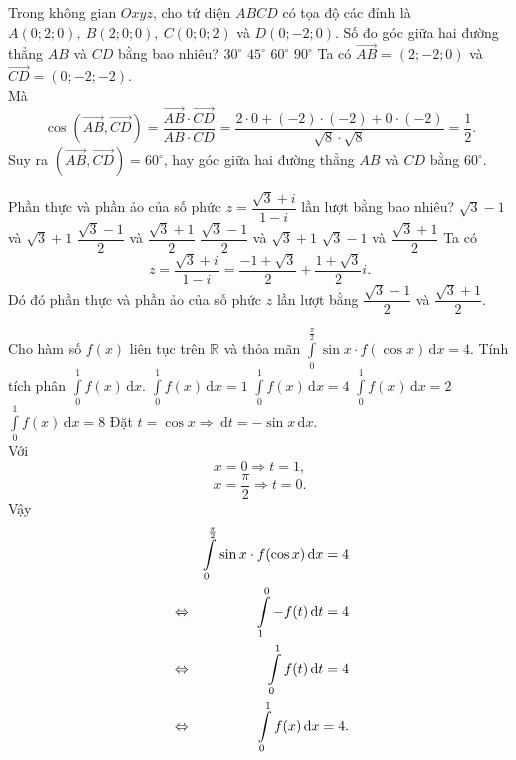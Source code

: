 \begin{ex}%
	Trong không gian $Oxyz$, cho tứ diện $ABCD$ có tọa độ các đỉnh là $A(0;2;0),~B(2;0;0),~C(0;0;2)$ và $D(0;-2;0)$. Số đo góc giữa hai đường thẳng $AB$ và $CD$ bằng bao nhiêu? 
	\choice
	{$30^\circ$}
	{$45^\circ$}
	{\True $60^\circ$}
	{$90^\circ$}
	\loigiai
	{
		Ta có $\vec{AB}=(2;-2;0)$ và $\vec{CD}=(0;-2;-2)$.\\
		Mà 
		\[\cos\left(\vec{AB},\vec{CD}\right)=\dfrac{\vec{AB}\cdot\vec{CD}}{AB\cdot CD}=\dfrac{2\cdot0+(-2)\cdot(-2)+0\cdot(-2)}{\sqrt{8}\cdot\sqrt{8}}=\dfrac{1}{2}.\]
		Suy ra $\left(\vec{AB},\vec{CD}\right)=60^\circ$, hay góc giữa hai đường thẳng $AB$ và $CD$ bằng $60^\circ$.
	}
\end{ex}

\begin{ex}%
	Phần thực và phần ảo của số phức $z=\dfrac{\sqrt{3}+i}{1-i}$ lần lượt bằng bao nhiêu?
	\choice
	{$\sqrt{3}-1$ và $\sqrt{3}+1$}
	{\True $\dfrac{\sqrt{3}-1}{2}$ và $\dfrac{\sqrt{3}+1}{2}$}
	{$\dfrac{\sqrt{3}-1}{2}$ và $\sqrt{3}+1$}
	{$\sqrt{3}-1$ và $\dfrac{\sqrt{3}+1}{2}$}
	\loigiai
	{
		Ta có 
		\[z=\dfrac{\sqrt{3}+i}{1-i}=\dfrac{-1+\sqrt{3}}{2}+\dfrac{1+\sqrt{3}}{2}i.\]
		Dó đó phần thực và phần ảo của số phức $z$ lần lượt bằng $\dfrac{\sqrt{3}-1}{2}$ và $\dfrac{\sqrt{3}+1}{2}$.
	}
\end{ex}

\begin{ex}%
	Cho hàm số $f(x)$ liên tục trên $\mathbb{R}$ và thỏa mãn $\displaystyle\int\limits_0^\frac{\pi}{2} \sin x\cdot f(\cos x)\mathrm{\,d}x=4$. Tính tích phân $\displaystyle\int\limits_0^1 f(x)\mathrm{\,d}x$.
	\choice
	{$\displaystyle\int\limits_0^1 f(x)\mathrm{\,d}x=1$}
	{\True $\displaystyle\int\limits_0^1 f(x)\mathrm{\,d}x=4$}
	{$\displaystyle\int\limits_0^1 f(x)\mathrm{\,d}x=2$}
	{$\displaystyle\int\limits_0^1 f(x)\mathrm{\,d}x=8$}
	\loigiai
	{
		Đặt $t=\cos x\Rightarrow\mathrm{\,d}t=-\sin x\mathrm{\,d}x$.\\
		Với 
		\[x=0\Rightarrow t=1,\]
		\[x=\dfrac{\pi}{2}\Rightarrow t=0.\]
		Vậy 
		\begin{eqnarray*}
			\allowdisplaybreaks
			& &\displaystyle\int\limits_0^\frac{\pi}{2} \sin x\cdot f(\cos x)\mathrm{\,d}x=4 \\
			& \Leftrightarrow &\displaystyle\int\limits_1^0-f(t)\mathrm{\,d}t=4 \\
			& \Leftrightarrow &\displaystyle\int\limits_0^1 f(t)\mathrm{\,d}t=4 \\
			& \Leftrightarrow &\displaystyle\int\limits_0^1 f(x)\mathrm{\,d}x=4.
		\end{eqnarray*}
	}
\end{ex}

